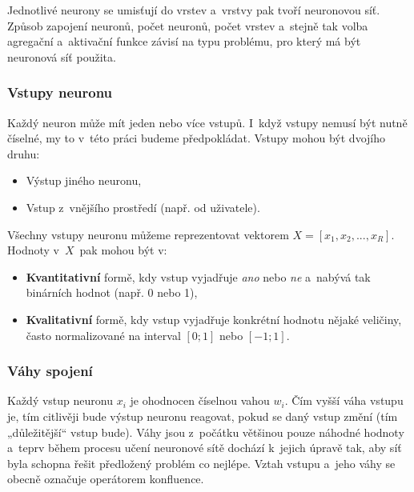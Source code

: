 \documentclass[a4paper,12pt]{article}
\begin{document}
{{Jednotlivé neurony se umisťují do vrstev a~vrstvy pak tvoří neuronovou síť. Způsob zapojení neuronů, počet neuronů, počet vrstev a~stejně tak volba agregační a~aktivační funkce závisí na typu problému, pro který má být neuronová síť použita.


\subsubsection{Vstupy neuronu}

Každý neuron může mít jeden nebo více vstupů. I~když vstupy nemusí být nutně číselné, my to v~této práci budeme předpokládat. Vstupy mohou být dvojího druhu:

\begin{itemize}
\item Výstup jiného neuronu,
\item Vstup z~vnějšího prostředí (např. od uživatele).
\end{itemize}

Všechny vstupy neuronu můžeme reprezentovat vektorem $X = [{x_1, x_2, ..., x_R}]$. Hodnoty v~$X$~pak mohou být v:

\begin{itemize}
\item \textbf{Kvantitativní} formě, kdy vstup vyjadřuje \textit{ano} nebo \textit{ne} a~nabývá tak binárních hodnot (např. 0 nebo 1),
\item \textbf{Kvalitativní} formě, kdy vstup vyjadřuje konkrétní hodnotu nějaké veličiny, často normalizované na interval $[0; 1]$ nebo $[-1; 1]$.
\end{itemize}

\subsubsection{Váhy spojení}

Každý vstup neuronu $x_i$ je ohodnocen číselnou vahou $w_i$. Čím vyšší váha vstupu je, tím citlivěji bude výstup neuronu reagovat, pokud se daný vstup změní (tím „důležitější“ vstup bude). Váhy jsou z~počátku většinou pouze náhodné hodnoty a~teprv během procesu učení neuronové sítě dochází k~jejich úpravě tak, aby síť byla schopna řešit předložený problém co nejlépe. Vztah vstupu a~jeho váhy se obecně označuje operátorem konfluence.~\cite{nn}


}}
\end{document}
